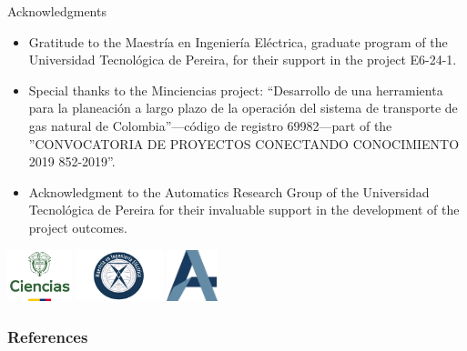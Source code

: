 \documentclass[hyperref={colorlinks,citecolor=blue,linkcolor=blue,urlcolor=blue}]{beamer}
\begin{document}
\begin{frame}{Acknowledgments}
    \begin{itemize}
        \item Gratitude to the Maestría en Ingeniería Eléctrica, graduate program of the Universidad Tecnológica de Pereira, for their support in the project E6-24-1.
        \item Special thanks to the Minciencias project: “Desarrollo de una herramienta para la planeación a largo plazo de la operación del sistema de transporte de gas natural de Colombia”—código de registro 69982—part of the ”CONVOCATORIA DE PROYECTOS CONECTANDO CONOCIMIENTO 2019 852-2019”.
        \item Acknowledgment to the Automatics Research Group of the Universidad Tecnológica de Pereira for their invaluable support in the development of the project outcomes.
    \end{itemize}

    \vfill %
    \begin{center}
        \includegraphics[height=1.5cm]{figures/logos/minciencias_logo.png}
        \includegraphics[height=1.5cm]{figures/logos/mie.jpg} 
        \includegraphics[height=1.5cm]{figures/logos/automatica.jpeg}
    \end{center}
\end{frame}


\begin{frame}[allowframebreaks]
        \frametitle{References}
        
        
\end{frame}
\end{document}
